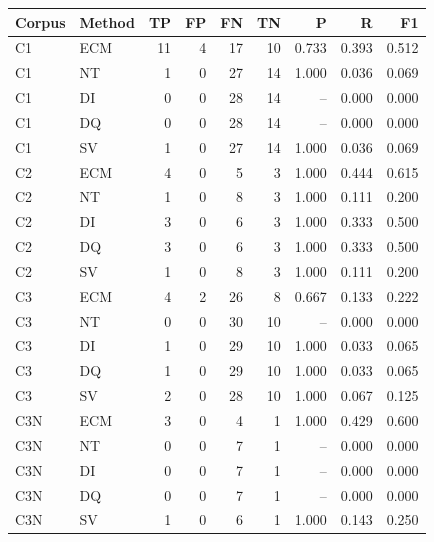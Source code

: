 \begin{tabular*}{\textwidth}{@{\extracolsep{\fill}}llrrrrrrr@{}}
\toprule
Corpus & Method & TP & FP & FN & TN & P & R & F1 \\
\midrule
C1 & ECM & 11 & 4 & 17 & 10 & 0.733 & 0.393 & 0.512 \\
C1 & NT & 1 & 0 & 27 & 14 & 1.000 & 0.036 & 0.069 \\
C1 & DI & 0 & 0 & 28 & 14 & -- & 0.000 & 0.000 \\
C1 & DQ & 0 & 0 & 28 & 14 & -- & 0.000 & 0.000 \\
C1 & SV & 1 & 0 & 27 & 14 & 1.000 & 0.036 & 0.069 \\
\addlinespace
C2 & ECM & 4 & 0 & 5 & 3 & 1.000 & 0.444 & 0.615 \\
C2 & NT & 1 & 0 & 8 & 3 & 1.000 & 0.111 & 0.200 \\
C2 & DI & 3 & 0 & 6 & 3 & 1.000 & 0.333 & 0.500 \\
C2 & DQ & 3 & 0 & 6 & 3 & 1.000 & 0.333 & 0.500 \\
C2 & SV & 1 & 0 & 8 & 3 & 1.000 & 0.111 & 0.200 \\
\addlinespace
C3 & ECM & 4 & 2 & 26 & 8 & 0.667 & 0.133 & 0.222 \\
C3 & NT & 0 & 0 & 30 & 10 & -- & 0.000 & 0.000 \\
C3 & DI & 1 & 0 & 29 & 10 & 1.000 & 0.033 & 0.065 \\
C3 & DQ & 1 & 0 & 29 & 10 & 1.000 & 0.033 & 0.065 \\
C3 & SV & 2 & 0 & 28 & 10 & 1.000 & 0.067 & 0.125 \\
\addlinespace
C3N & ECM & 3 & 0 & 4 & 1 & 1.000 & 0.429 & 0.600 \\
C3N & NT & 0 & 0 & 7 & 1 & -- & 0.000 & 0.000 \\
C3N & DI & 0 & 0 & 7 & 1 & -- & 0.000 & 0.000 \\
C3N & DQ & 0 & 0 & 7 & 1 & -- & 0.000 & 0.000 \\
C3N & SV & 1 & 0 & 6 & 1 & 1.000 & 0.143 & 0.250 \\
\bottomrule
\end{tabular*}
